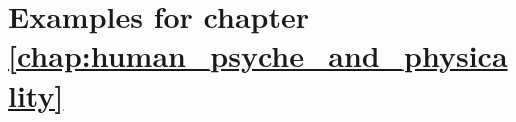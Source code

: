 \section{Examples for chapter \ref{chap:human_psyche_and_physicality}} \label{chap:human_psyche_and_physicality_examples}
